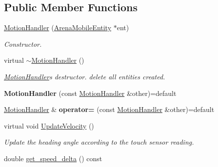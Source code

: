 \subsection*{Public Member Functions}
\begin{DoxyCompactItemize}
\item 
\hyperlink{classMotionHandler_a48c0070bfda6acb8a7493eb7fe1200c4}{Motion\+Handler} (\hyperlink{classArenaMobileEntity}{Arena\+Mobile\+Entity} $\ast$ent)\hypertarget{classMotionHandler_a48c0070bfda6acb8a7493eb7fe1200c4}{}\label{classMotionHandler_a48c0070bfda6acb8a7493eb7fe1200c4}

\begin{DoxyCompactList}\small\item\em Constructor. \end{DoxyCompactList}\item 
virtual \hyperlink{classMotionHandler_aeb9e090d5d5f750767ea82d604f11c9c}{$\sim$\+Motion\+Handler} ()\hypertarget{classMotionHandler_aeb9e090d5d5f750767ea82d604f11c9c}{}\label{classMotionHandler_aeb9e090d5d5f750767ea82d604f11c9c}

\begin{DoxyCompactList}\small\item\em \hyperlink{classMotionHandler}{Motion\+Handler}\textquotesingle{}s destructor. {\ttfamily delete} all entities created. \end{DoxyCompactList}\item 
{\bfseries Motion\+Handler} (const \hyperlink{classMotionHandler}{Motion\+Handler} \&other)=default\hypertarget{classMotionHandler_a91dc98beab9d5ccce6b6c18ce32c0488}{}\label{classMotionHandler_a91dc98beab9d5ccce6b6c18ce32c0488}

\item 
\hyperlink{classMotionHandler}{Motion\+Handler} \& {\bfseries operator=} (const \hyperlink{classMotionHandler}{Motion\+Handler} \&other)=default\hypertarget{classMotionHandler_ad45188f2d9794fd2b257d586a7b522e6}{}\label{classMotionHandler_ad45188f2d9794fd2b257d586a7b522e6}

\item 
virtual void \hyperlink{classMotionHandler_ad9bfac3d0ec3cec1d607f41475886c3c}{Update\+Velocity} ()\hypertarget{classMotionHandler_ad9bfac3d0ec3cec1d607f41475886c3c}{}\label{classMotionHandler_ad9bfac3d0ec3cec1d607f41475886c3c}

\begin{DoxyCompactList}\small\item\em Update the heading angle according to the touch sensor reading. \end{DoxyCompactList}\item 
double \hyperlink{classMotionHandler_a7a9b503e3da267c7af25d58daff5f216}{get\+\_\+speed\+\_\+delta} () const \hypertarget{classMotionHandler_a7a9b503e3da267c7af25d58daff5f216}{}\label{classMotionHandler_a7a9b503e3da267c7af25d58daff5f216}


\end{DoxyCompactItemize}
